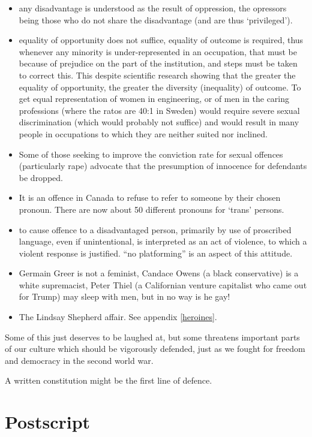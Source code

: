 \documentclass[14pt,titlepage]{extarticle}
\begin{document}
\begin{itemize}
\item any disadvantage is understood as the result of oppression, the opressors being those who do not share the disadvantage (and are thus `privileged').
\item equality of opportunity does not suffice, equality of outcome is required, thus whenever any minority is under-represented in an occupation, that must be because of prejudice on the part of the institution, and steps must be taken to correct this.
  This despite scientific research showing that the greater the equality of opportunity, the greater the diversity (inequality) of outcome.
  To get equal representation of women in engineering, or of men in the caring professions (where the ratos are 40:1 in Sweden) would require severe sexual discrimination (which would probably not suffice) and would result in many people in occupations to which they are neither suited nor inclined.
\item Some of those seeking to improve the conviction rate for sexual offences (particularly rape) advocate that the presumption of innocence for defendants be dropped.
\item It is an offence in Canada to refuse to refer to someone by their chosen pronoun.
  There are now about 50 different pronouns for `trans' persons.
\item to cause offence to a disadvantaged person, primarily by use of proscribed language, even if unintentional, is interpreted as an act of violence, to which a violent response is justified.
  ``no platforming'' is an aspect of this attitude.
\item Germain Greer is not a feminist, Candace Owens (a black conservative) is a white supremacist, Peter Thiel (a Californian venture capitalist who came out for Trump) may sleep with men, but in no way is he gay!
  \item The Lindsay Shepherd affair.  See appendix \ref{heroines}.
  \end{itemize}

Some of this just deserves to be laughed at, but some threatens important parts of our culture which should be vigorously defended, just as we fought for freedom and democracy in the second world war.

A written constitution might be the first line of defence.

\section{Postscript}
\end{document}
